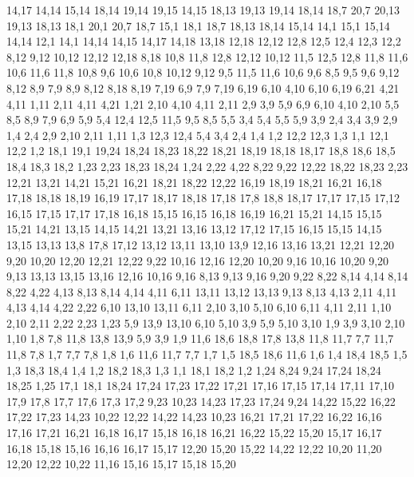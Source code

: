 14,17
%
14,14
15,14
18,14
19,14
19,15
14,15
%
18,13
19,13
19,14
18,14
%
18,7
20,7
20,13
19,13
18,13
%
18,1
20,1
20,7
18,7
%
15,1
18,1
18,7
18,13
18,14
15,14
%
14,1
15,1
15,14
14,14
%
12,1
14,1
14,14
14,15
14,17
14,18
13,18
12,18
12,12
12,8
12,5
12,4
12,3
12,2
%
8,12
9,12
10,12
12,12
12,18
8,18
%
10,8
11,8
12,8
12,12
10,12
%
11,5
12,5
12,8
11,8
11,6
%
10,6
11,6
11,8
10,8
%
9,6
10,6
10,8
10,12
9,12
%
9,5
11,5
11,6
10,6
9,6
%
8,5
9,5
9,6
9,12
8,12
8,9
%
7,9
8,9
8,12
8,18
8,19
7,19
%
6,9
7,9
7,19
6,19
6,10
%
4,10
6,10
6,19
6,21
4,21
4,11
%
1,11
2,11
4,11
4,21
1,21
%
2,10
4,10
4,11
2,11
%
2,9
3,9
5,9
6,9
6,10
4,10
2,10
%
5,5
8,5
8,9
7,9
6,9
5,9
%
5,4
12,4
12,5
11,5
9,5
8,5
5,5
%
3,4
5,4
5,5
5,9
3,9
%
2,4
3,4
3,9
2,9
%
1,4
2,4
2,9
2,10
2,11
1,11
%
1,3
12,3
12,4
5,4
3,4
2,4
1,4
%
1,2
12,2
12,3
1,3
%
1,1
12,1
12,2
1,2
18,1
19,1
19,24
18,24
18,23
18,22
18,21
18,19
18,18
18,17
18,8
18,6
18,5
18,4
18,3
18,2
%
1,23
2,23
18,23
18,24
1,24
%
2,22
4,22
8,22
9,22
12,22
18,22
18,23
2,23
%
12,21
13,21
14,21
15,21
16,21
18,21
18,22
12,22
%
16,19
18,19
18,21
16,21
%
16,18
17,18
18,18
18,19
16,19
%
17,17
18,17
18,18
17,18
%
17,8
18,8
18,17
17,17
17,15
17,12
%
16,15
17,15
17,17
17,18
16,18
%
15,15
16,15
16,18
16,19
16,21
15,21
%
14,15
15,15
15,21
14,21
%
13,15
14,15
14,21
13,21
13,16
%
13,12
17,12
17,15
16,15
15,15
14,15
13,15
13,13
%
13,8
17,8
17,12
13,12
13,11
13,10
13,9
%
12,16
13,16
13,21
12,21
12,20
%
9,20
10,20
12,20
12,21
12,22
9,22
%
10,16
12,16
12,20
10,20
%
9,16
10,16
10,20
9,20
%
9,13
13,13
13,15
13,16
12,16
10,16
9,16
%
8,13
9,13
9,16
9,20
9,22
8,22
8,14
%
4,14
8,14
8,22
4,22
%
4,13
8,13
8,14
4,14
%
4,11
6,11
13,11
13,12
13,13
9,13
8,13
4,13
%
2,11
4,11
4,13
4,14
4,22
2,22
%
6,10
13,10
13,11
6,11
%
2,10
3,10
5,10
6,10
6,11
4,11
2,11
%
1,10
2,10
2,11
2,22
2,23
1,23
%
5,9
13,9
13,10
6,10
5,10
%
3,9
5,9
5,10
3,10
%
1,9
3,9
3,10
2,10
1,10
%
1,8
7,8
11,8
13,8
13,9
5,9
3,9
1,9
%
11,6
18,6
18,8
17,8
13,8
11,8
11,7
%
7,7
11,7
11,8
7,8
%
1,7
7,7
7,8
1,8
%
1,6
11,6
11,7
7,7
1,7
%
1,5
18,5
18,6
11,6
1,6
%
1,4
18,4
18,5
1,5
%
1,3
18,3
18,4
1,4
%
1,2
18,2
18,3
1,3
%
1,1
18,1
18,2
1,2
1,24
8,24
9,24
17,24
18,24
18,25
1,25
%
17,1
18,1
18,24
17,24
17,23
17,22
17,21
17,16
17,15
17,14
17,11
17,10
17,9
17,8
17,7
17,6
17,3
17,2
%
9,23
10,23
14,23
17,23
17,24
9,24
%
14,22
15,22
16,22
17,22
17,23
14,23
%
10,22
12,22
14,22
14,23
10,23
%
16,21
17,21
17,22
16,22
%
16,16
17,16
17,21
16,21
16,18
16,17
%
15,18
16,18
16,21
16,22
15,22
15,20
%
15,17
16,17
16,18
15,18
%
15,16
16,16
16,17
15,17
%
12,20
15,20
15,22
14,22
12,22
%
10,20
11,20
12,20
12,22
10,22
%
11,16
15,16
15,17
15,18
15,20
